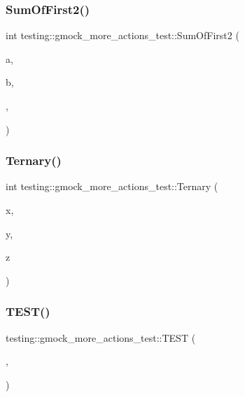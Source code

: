 \subsubsection{\texorpdfstring{SumOfFirst2()}{SumOfFirst2()}}
{\footnotesize\ttfamily int testing\+::gmock\+\_\+more\+\_\+actions\+\_\+test\+::\+Sum\+Of\+First2 (\begin{DoxyParamCaption}\item[{int}]{a,  }\item[{int}]{b,  }\item[{\mbox{\hyperlink{namespacetesting_a603e329ec0263ebfcf16f712810bd511}{Unused}}}]{,  }\item[{\mbox{\hyperlink{namespacetesting_a603e329ec0263ebfcf16f712810bd511}{Unused}}}]{ }\end{DoxyParamCaption})}

\mbox{\label{namespacetesting_1_1gmock__more__actions__test_ab98b352528a0b72625b4710a6fc648a1}} 
\subsubsection{\texorpdfstring{Ternary()}{Ternary()}}
{\footnotesize\ttfamily int testing\+::gmock\+\_\+more\+\_\+actions\+\_\+test\+::\+Ternary (\begin{DoxyParamCaption}\item[{int}]{x,  }\item[{char}]{y,  }\item[{short}]{z }\end{DoxyParamCaption})}

\mbox{\label{namespacetesting_1_1gmock__more__actions__test_a9c5fbd26c6cc6ed31aed5bafb2fa8e5c}} 
\subsubsection{\texorpdfstring{TEST()}{TEST()}\hspace{0.1cm}{\footnotesize\ttfamily [1/47]}}
{\footnotesize\ttfamily testing\+::gmock\+\_\+more\+\_\+actions\+\_\+test\+::\+T\+E\+ST (\begin{DoxyParamCaption}\item[{Invoke\+Test}]{,  }\item[{\mbox{\hyperlink{namespacetesting_1_1gmock__more__actions__test_acdd2dd80f777fdb770b513b63064ac19}{Nullary}}}]{ }\end{DoxyParamCaption})}

